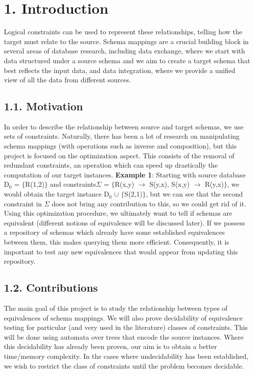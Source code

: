 \documentclass[11pt, a4paper, dvipsnames]{article}
\begin{document}
\newpage

\setcounter{secnumdepth}{-1}
\setcounter{tocdepth}{2}
\tableofcontents

\newpage

\section{1. Introduction}
Logical constraints can be used to represent these relationships, telling how the target must relate to the source. Schema mappings are a crucial building block in several areas of database research, including data exchange\cite{dataexchange}, where we start with data structured under a source schema and we aim to create a target schema that best reflects the input data, and data integration\cite{dataintegration}, where we provide a unified view of all the data from different sources.

\subsection{1.1. Motivation}
In order to describe the relationship between source and target schemas, we use sets of constraints. Naturally, there has been a lot of research on manipulating schema mappings (with operations such as inverse and composition), but this project is focused on the optimization aspect. This consists of the removal of redundant constraints, an operation which can speed up drastically the computation of our target instances. \newline
\textbf{Example 1}: Starting with source database D$_{0}$ = $\{$R(1,2)$\}$ and constraints\newline $\Sigma$ = $\{$R(x,y) $\rightarrow$ S(y,x), S(x,y) $\rightarrow$ R(y,x)$\}$, we would obtain the target instance D$_{0}$ $\cup$ $\{$S(2,1)$\}$, but we can see that the second constraint in $\Sigma$ does not bring any contribution to this, so we could get rid of it.\newline
Using this optimization procedure, we ultimately want to tell if schemas are equivalent (different notions of equivalence will be discussed later). If we possess a repository of schemas which already have some established equivalences between them, this makes querying them more efficient. Consequently, it is important to test any new equivalences that would appear from updating this repository. 

\subsection{1.2. Contributions}
The main goal of this project is to study the relationship between types of equivalences of schema mappings. We will also prove decidability of equivalence testing for particular (and very used in the literature) classes of constraints. This will be done using automata over trees that encode the source instances. Where this decidability has already been proven, our aim is to obtain a better time/memory complexity. In the cases where undecidability has been established, we wish to restrict the class of constraints until the problem becomes decidable. 
\end{document}
